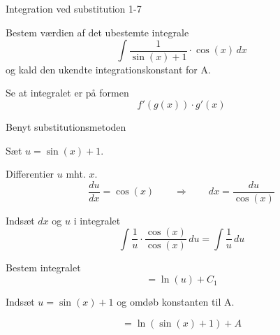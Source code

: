 \documentclass{article}
\begin{document}
\begin{exercise}{Integration ved substitution 1-7}


Bestem værdien af det ubestemte integrale
\[
\int \frac{1}{\sin(x)+1} \cdot \cos(x) \, dx
\]
og kald den ukendte integrationskonstant for A.




\hint

Se at integralet er på formen
\[
f'(g(x)) \cdot g'(x)
\]

\hint

Benyt substitutionsmetoden

\hint

Sæt $u=\sin(x)+1$.


\hint

Differentier $u$ mht. $x$.
\[
\frac{du}{dx} = \cos(x) \qquad\Rightarrow \qquad dx = \frac{du}{\cos(x)}
\]

\hint

Indsæt $dx$ og $u$ i integralet
\[
\int \frac{1}{u} \cdot \frac{\cos(x)}{\cos(x)} \, du = \int \frac{1}{u} \, du
\]

\hint

Bestem integralet
\[
= \ln(u) + C_1
\]


\hint

Indsæt $u = \sin(x)+1$ og omdøb konstanten til A.

\hint

\[
= \ln(\sin(x)+1) + A
\]


\end{exercise}

\newpage
\end{document}

